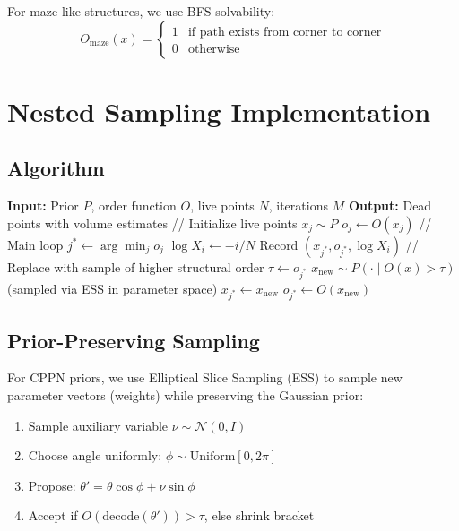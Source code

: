 For maze-like structures, we use BFS solvability:
\begin{equation}
O_{\text{maze}}(x) = \begin{cases}
1 & \text{if path exists from corner to corner} \\
0 & \text{otherwise}
\end{cases}
\end{equation}




\section{Nested Sampling Implementation}
\label{app:nested_sampling}

\subsection{Algorithm}

\begin{algorithm}[H]
\caption{Full Nested Sampling Procedure}
\begin{algorithmic}
\STATE \textbf{Input:} Prior $P$, order function $O$, live points $N$, iterations $M$
\STATE \textbf{Output:} Dead points with volume estimates
\STATE
\STATE // Initialize live points
    \STATE $x_j \sim P$
    \STATE $o_j \leftarrow O(x_j)$
\ENDFOR
\STATE
\STATE // Main loop
    \STATE $j^* \leftarrow \arg\min_j o_j$
    \STATE $\log X_i \leftarrow -i/N$
    \STATE Record $(x_{j^*}, o_{j^*}, \log X_i)$
    \STATE
    \STATE // Replace with sample of higher structural order
    \STATE $\tau \leftarrow o_{j^*}$
    \REPEAT
        \STATE $x_{\text{new}} \sim P(\cdot \mid O(x)>\tau)$ (sampled via ESS in parameter space)
    \STATE $x_{j^*} \leftarrow x_{\text{new}}$
    \STATE $o_{j^*} \leftarrow O(x_{\text{new}})$
\ENDFOR
\end{algorithmic}
\end{algorithm}

\subsection{Prior-Preserving Sampling}

For CPPN priors, we use Elliptical Slice Sampling (ESS) to sample new parameter vectors (weights) while preserving the Gaussian prior:

\begin{enumerate}
    \item Sample auxiliary variable $\nu \sim \mathcal{N}(0, I)$
    \item Choose angle uniformly: $\phi \sim \text{Uniform}[0, 2\pi]$
    \item Propose: $\theta' = \theta \cos\phi + \nu \sin\phi$
    \item Accept if $O(\text{decode}(\theta')) > \tau$, else shrink bracket
\end{enumerate}

